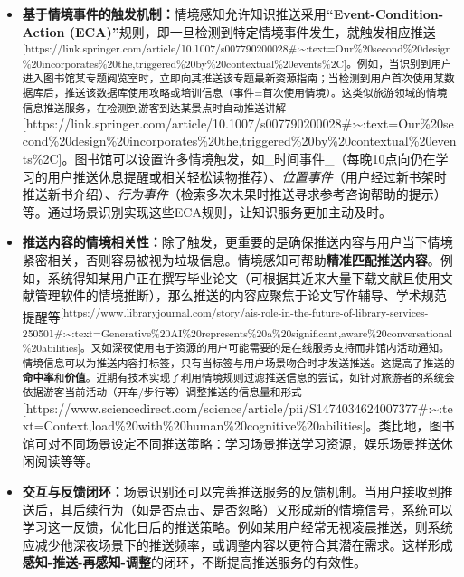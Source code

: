 \documentclass[
  letterpaper,
]{scrbook}
\begin{document}
\begin{itemize}
\item
  \textbf{基于情境事件的触发机制：}情境感知允许知识推送采用\textbf{``Event-Condition-Action
  (ECA)''}规则，即一旦检测到特定情境事件发生，就触发相应推送\textsuperscript{{[}https://link.springer.com/article/10.1007/s007790200028\#:\textasciitilde:text=Our\%20second\%20design\%20incorporates\%20the,triggered\%20by\%20contextual\%20events\%2C{]}。例如，当识别到用户进入图书馆某专题阅览室时，立即向其推送该专题最新资源指南；当检测到用户首次使用某数据库后，推送该数据库使用攻略或培训信息（事件=首次使用情境）。这类似旅游领域的情境信息推送服务，在检测到游客到达某景点时自动推送讲解}{[}https://link.springer.com/article/10.1007/s007790200028\#:\textasciitilde:text=Our\%20second\%20design\%20incorporates\%20the,triggered\%20by\%20contextual\%20events\%2C{]}。图书馆可以设置许多情境触发，如\_时间事件\_（每晚10点向仍在学习的用户推送休息提醒或相关轻松读物推荐）、\emph{位置事件}（用户经过新书架时推送新书介绍）、\emph{行为事件}（检索多次未果时推送寻求参考咨询帮助的提示）等。通过场景识别实现这些ECA规则，让知识服务更加主动及时。
\item
  \textbf{推送内容的情境相关性：}除了触发，更重要的是确保推送内容与用户当下情境紧密相关，否则容易被视为垃圾信息。情境感知可帮助\textbf{精准匹配推送内容}。例如，系统得知某用户正在撰写毕业论文（可根据其近来大量下载文献且使用文献管理软件的情境推断），那么推送的内容应聚焦于论文写作辅导、学术规范提醒等\textsuperscript{{[}https://www.libraryjournal.com/story/ais-role-in-the-future-of-library-services-250501\#:\textasciitilde:text=Generative\%20AI\%20represents\%20a\%20significant,aware\%20conversational\%20abilities{]}。又如深夜使用电子资源的用户可能需要的是在线服务支持而非馆内活动通知。情境信息可以为推送内容打标签，只有当标签与用户场景吻合时才发送推送。这提高了推送的\textbf{命中率}和\textbf{价值}。近期有技术实现了利用情境规则过滤推送信息的尝试，如针对旅游者的系统会依据游客当前活动（开车/步行等）调整推送的信息量和形式}{[}https://www.sciencedirect.com/science/article/pii/S1474034624007377\#:\textasciitilde:text=Context,load\%20with\%20human\%20cognitive\%20abilities{]}。类比地，图书馆可对不同场景设定不同推送策略：学习场景推送学习资源，娱乐场景推送休闲阅读等等。
\item
  \textbf{交互与反馈闭环：}场景识别还可以完善推送服务的反馈机制。当用户接收到推送后，其后续行为（如是否点击、是否忽略）又形成新的情境信号，系统可以学习这一反馈，优化日后的推送策略。例如某用户经常无视凌晨推送，则系统应减少他深夜场景下的推送频率，或调整内容以更符合其潜在需求。这样形成\textbf{感知-推送-再感知-调整}的闭环，不断提高推送服务的有效性。
\end{itemize}
\end{document}
